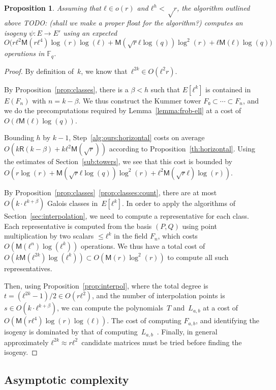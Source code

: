 \documentclass{lms}
\newcommand{\todo}[1]{{\color{red}TODO: #1}}
\newtheorem{prop}[thm]{Proposition}
\def\cout#1{\mathsf{#1}}
\newcommand{\F}{\mathbb{F}}
\newcommand{\MM}{\cout{M}}
\newcommand{\RR}{\cout{R}}
\begin{document}
\begin{prop}
  \label{prop:full-complexity}
  Assuming that $ℓ\in o(r)$ and $ℓ^h<√ r$, the algorithm outlined
  above \todo{(shall we make a proper float for the algorithm?)}
  computes an isogeny $ψ:E→E'$ using an expected
  \[O\bigl(r ℓ^2\MM(rℓ^4)\log(r)\log(ℓ) + \MM(\sqrt{r} ℓ \log(q))\log^2(r) +
    ℓ\MM(ℓ)\log(q)\bigr)\]
  operations in $\F_q$.
\end{prop}
\begin{proof}
By definition of~$k$, we know that~$ℓ^{2k} ∈ O(ℓ^2 r)$.

  By Proposition~\ref{prop:classes}, there is a $β<h$ such that
  $E[ℓ^k]$ is contained in $E(F_n)$ with $n=k-β$. We thus construct
  the Kummer tower $F₀⊂\cdots⊂F_n$, and we do the precomputations
  required by Lemma~\ref{lemma:frob-ell} at a cost of
  $O(ℓ\MM(ℓ)\log(q))$.

  Bounding $h$ by $k-1$, Step~\ref{alg:ours:horizontal} costs on average
  $O(k\RR(k-\beta) + kℓ^2\MM(\sqrt{r}))$ according to
  Proposition~\ref{th:horizontal}. Using the estimates of
  Section~\ref{sub:towers}, we see that this cost is bounded by
  $O(r\log(r) +\MM(\sqrt{r} ℓ \log(q))\log^2(r) +
  ℓ^2\MM(\sqrt{r} ℓ)\log(r))$.%

  By Proposition~\ref{prop:classes}~\ref{prop:classes:count}, there
  are at most~$O(k· ℓ^{k+β})$ Galois classes in~$E[ℓ^k]$. In order to
  apply the algorithms of Section~\ref{sec:interpolation}, we need to
  compute a representative for each class. Each representative is
  computed from the basis $(P,Q)$ using point multiplication by two
  scalars $≤ℓ^k$ in the field $F_n$, which costs
  $O(\MM(ℓ^n)\log(ℓ^k))$ operations. We thus have a total cost of
  $O(k\MM(ℓ^{2k})\log(ℓ^k)) ⊂ O(\MM(r)\log^2(r))$ to compute all such representatives.

  Then, using Proposition~\ref{prop:interpol}, where the total degree
  is~$t = (ℓ^{2k}-1)/2∈O(r ℓ^2)$, and the number of interpolation points
  is $s∈O(k·ℓ^{k+β})$, we can compute the polynomials~$T$
  and~$L_{a,b}$ at a cost of~$O(\MM(r ℓ^4)\log(r)\log(ℓ))$.  The cost
  of computing $F_{a,b}$, and identifying the isogeny is dominated by
  that of computing~$L_{a,b}$~\cite[§3.3]{df10}.  Finally, in general
  approximately $ℓ^{2k} ≈ r ℓ^2$~candidate matrices must be tried before
  finding the isogeny.
\end{proof}

\subsection{Asymptotic complexity}
\label{sub:complexity}
\end{document}
